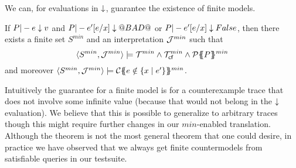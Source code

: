 We can, for evaluations in $\downarrow$, guarantee the existence of finite models.
\begin{theorem}\label{thm:finite-model} If $P |- e \downarrow v$ and
$P |- e'[e/x] \downarrow @BAD@$ or $P |- e'[e/x] \downarrow False$, then
there exists a finite set $S^{min}$ and an interpretation ${{\cal J}}^{min}$ such that
\[ \langle S^{min},{{\cal J}}^{min}\rangle \models {\cal T}^{min} \land {\cal T}_{\textsf{cf}}^{min} \land {\cal P}\{\!\!\{P\}\!\!\}^{min} \]
and moreover $\langle S^{min},{{\cal J}}^{min}\rangle \models {\cal C}\{\!\!\{e \notin \{ x \mid e' \}\}\!\!\}^{min}$.
\end{theorem}
Intuitively the guarantee for a finite model is for a counterexample trace that does not involve some
infinite value (because that would not belong in the $\downarrow$ evaluation). We believe that this
is possible to generalize to arbitrary traces though this might require further changes in our
$min$-enabled translation. Although the theorem is not the most general theorem that one could desire,
in practice we have observed that we always get finite countermodels from satisfiable queries in
our testsuite.



